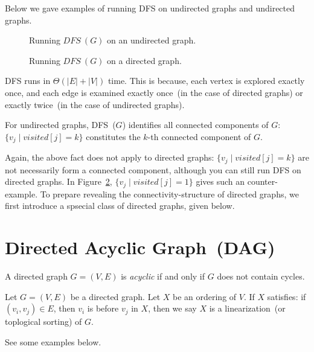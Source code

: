 Below we gave examples of running DFS on undirected graphs and undirected graphs.

\begin{figure}[h!]
\centering{}
\caption{Running $DFS~(G)$ on an undirected graph.}
\label{fig:dfs-undirected}
\end{figure}

\begin{figure}[h!]
\centering{}
\caption{Running $DFS~(G)$ on a directed graph.}
\label{fig:dfs-directed}
\end{figure}

DFS runs in $\Theta(|E| + |V|)$ time. This is because, each vertex
is explored exactly once, and each edge is examined exactly once~(in the case of directed graphs)
or exactly twice~(in the case of undirected graphs).

\begin{fact}
For undirected graphs, DFS~($G$) identifies all connected components of $G$:
	$\{v_j \mid visited[j] = k \}$ constitutes the $k$-th connected component of $G$.
\end{fact}

Again, the above fact does not apply to directed graphs: $\{v_j \mid visited[j] = k\}$
are not necessarily form a connected component, although you can still run DFS on directed graphs. In
Figure~\ref{fig:dfs-directed}, $\{v_j \mid visited[j] = 1\}$ gives such an
counter-example.
To prepare revealing the connectivity-structure of directed graphs, we first introduce
a spsecial class of directed graphs, given below.

\section*{Directed Acyclic Graph~(DAG)}

\begin{definition}[DAG]
A directed graph $G = (V, E)$ is \emph{acyclic} if and only if $G$ does not contain cycles.
\end{definition}

\begin{definition}
Let $G = (V,E)$ be a directed graph. Let $X$ be an ordering of $V$.
If $X$ satisfies: if $(v_i, v_j)\in E$, then $v_i$ is before $v_j$ in $X$,
then we say $X$ is a linearization~(or toplogical sorting) of $G$.
\end{definition}


See some examples below.

